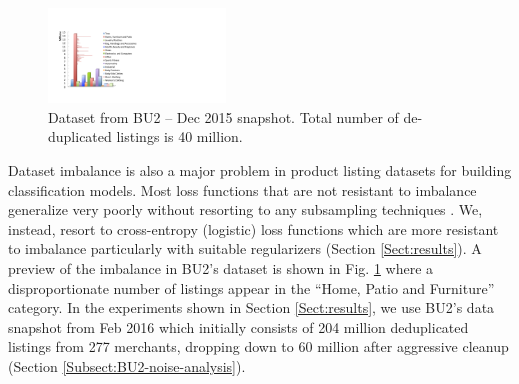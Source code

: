 \begin{figure}
	\centering
	\vspace{-0.5cm}
	\includegraphics[width=0.42\textwidth]{images/BU2-dataset-Dec2015}
	\vspace{-0.6cm}
	\caption{{\small Dataset from BU2 -- Dec 2015 snapshot. Total number of de-duplicated listings is 40 million.}}
	\vspace{-0.6cm}
	\label{Figure_BU2-datset-earlier}
\end{figure}
Dataset imbalance is also a major problem in product listing datasets for building classification models.
Most loss functions that are not resistant to imbalance generalize very poorly without resorting to any subsampling techniques \cite{Chawla02:SMOTE}. 
We, instead, resort to cross-entropy (logistic) loss functions which are more resistant to imbalance particularly with suitable regularizers (Section \ref{Sect:results}). 
A preview of the imbalance in BU2's dataset is shown in Fig. \ref{Figure_BU2-datset-earlier} where a disproportionate number of listings appear in the ``Home, Patio and Furniture'' category.
In the experiments shown in Section \ref{Sect:results}, we use BU2's data snapshot from Feb 2016 which initially consists of 204 million deduplicated listings from 277 merchants, dropping down to 60 million after aggressive cleanup (Section \ref{Subsect:BU2-noise-analysis}).


